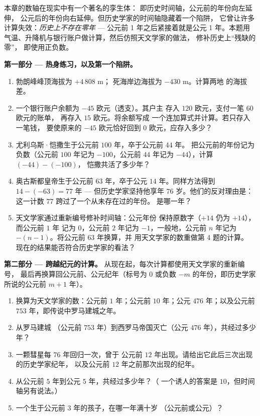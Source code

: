 \begin{problem}
\label{pb:g7:negatives:1}
本章的数轴在现实中有一个著名的孪生体：
即历史时间轴，公元前的年份向左延伸，
公元后的年份向右延伸。但历史学家的时间轴隐藏着一个陷阱，
它曾让许多计算失效：\emph{历史上不存在零年}
--- 公元前 1 年之后紧接着就是公元 1 年。本题用
气温、升降机与银行账户做计算，然后仿照天文学家的做法，
修补历史上“残缺的零”，
即使用正负数。

\medskip
\noindent\textbf{第一部分 --- 热身练习，以及第一个陷阱。}
\begin{enumerate}
  \item 勃朗峰峰顶海拔为 $+4\,808$ m；
        死海岸边海拔为 $-430$ m。计算两地
        的海拔差。
  \item 一个银行账户余额为 $-45$ 欧元（透支）。其户主
        存入 $120$ 欧元，支付一笔 $60$ 欧元的账单，
        再存入 $15$ 欧元。将余额写成
        一个连加算式并计算。若只存入一笔钱，
        要使原来的 $-45$ 欧元恰好回到
        $0$ 欧元，应存入多少？
  \item 尤利乌斯·恺撒生于公元前 $100$ 年，卒于公元前 $44$ 年。
        把公元前的年份记为负数（公元前 $100$ 年记为
        $-100$，公元前 $44$ 年记为 $-44$），计算 $(-44) - (-100)$，
        恺撒共活了多少年？
  \item 奥古斯都皇帝生于公元前 $63$ 年，卒于公元
        $14$ 年。同样方法得到 $14 - (-63) = 77$ 年 ---
        但历史学家坚持他享年 $76$ 岁。他们的反对理由是：
        这一计数 $77$ 跨过了一个从未存在过的年份。
        是哪一年？
  \item 天文学家通过重新编号修补时间轴：公元年份
        保持原数字（$+14$ 仍为 $+14$），而公元前 $1$ 年
        记为 $0$，公元前 $2$ 年记为 $-1$，一般地，公元前
        $n$ 年记为 $-(n - 1)$。将公元前 $63$ 年换算，并
        用天文学家的数重做第 4 题的计算。
        现在的结果能否符合历史学家的看法？
\end{enumerate}

\medskip
\noindent\textbf{第二部分 --- 跨越纪元的计算。}
从现在起，每次计算都使用天文学家的重新编号，
最后再换算回公元前、公元纪年（标号为
$0$ 或负数 $-m$ 的年份，即历史学家所说的公元前 $m + 1$ 年）。
\begin{enumerate}[resume]
  \item 换算为天文学家的数：公元前 $1$ 年；公元前 $10$ 年；公元
        $476$ 年；以及公元前 $753$ 年，即传说中罗马建城之年。
  \item 从罗马建城
        （公元前 $753$ 年）到西罗马帝国灭亡（公元 $476$ 年），共经过多少年？
  \item 一颗彗星每 $76$ 年回归一次，曾于
        公元前 $12$ 年出现。请给出它此后三次出现的历史学家纪年，
        以及公元前 $12$ 年之前那次出现的纪年。
  \item 从公元前 $5$ 年到公元 $5$ 年，共经过多少年？（
        一个诱人的答案是 $10$，但时间轴另有说法。）
  \item 一个生于公元前 $3$ 年的孩子，在哪一年满十岁
        （公元前或公元）？
\end{enumerate}


\end{problem}
